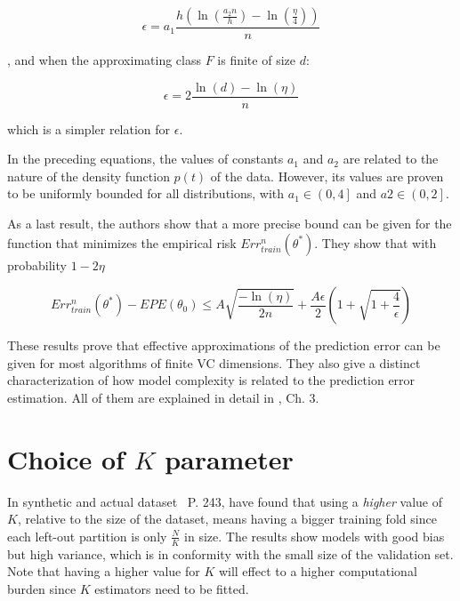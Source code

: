\begin{appendices}
\begin{equation}
\epsilon = a_1 \frac{h \left( \ln(\frac{a_2 n}{h} ) - \ln(\frac{\eta}{4} ) \right)}{n}
\end{equation}\label{eq:vapnik-epsilonBound}

, and when the approximating class $F$ is finite of size $d$:

\begin{equation}
\epsilon = 2 \frac{ \ln(d) - \ln(\eta)}{n}
\end{equation}\label{eq:vapnik-epsilonBoundSimple}


which is a simpler relation for $\epsilon$.

In the preceding equations, the values of constants $a_1$ and $a_2$ are related to the nature of the density function $p(t)$ of the data.
However, its values are proven to be uniformly bounded for all distributions, with $a_1 \in {\left(0,4 \right] }$ and $a2 \in {\left(0,2 \right]}$.

As a last result, the authors show that a more precise bound can be given for the function that minimizes the empirical risk $Err^n_{train}(\theta^*)$.
They show that with probability $1 - 2\eta$

\begin{equation}
Err^n_{train}(\theta^*) - EPE(\theta_0) \leq A \sqrt{\frac{-\ln(\eta)}{2n} } + \frac{A \epsilon}{2}\left( 1+ \sqrt{1 + \frac{4}{\epsilon} } \right)
\end{equation}\label{eq:vapnik-classificationBoundPrecise}

These results prove that effective approximations of the prediction error can be given for most algorithms of finite VC dimensions.
They also give a distinct characterization of how model complexity is related to the prediction error estimation.
All of them are explained in detail in \textcite{vapnik-nature2000}, Ch. 3.



\section{Choice of \texorpdfstring{$K$ parameter}{Lg} }\label{appx:sec:optimalKfoldNumber}

In synthetic and actual dataset~\textcite{hastie-elemstatslearn} P.
243, have found that using a \textit{higher} value of $K$, relative to the size of the dataset, means having a bigger training fold since each left-out partition is only $\frac{N}{K}$ in size.
The results show models with good bias but high variance, which is in conformity with the small size of the validation set.
Note that having a higher value for $K$ will effect to a higher computational burden since $K$ estimators need to be fitted.


\end{appendices}
